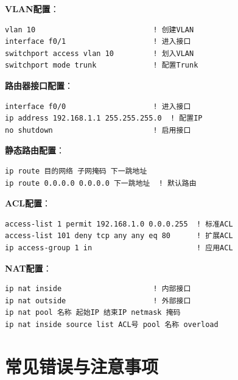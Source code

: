 \documentclass[12pt,a4paper]{ctexart}
\begin{document}
\begin{keybox}
\textbf{VLAN配置}：
\begin{lstlisting}
vlan 10                           ! 创建VLAN
interface f0/1                    ! 进入接口
switchport access vlan 10         ! 划入VLAN
switchport mode trunk             ! 配置Trunk
\end{lstlisting}

\textbf{路由器接口配置}：
\begin{lstlisting}
interface f0/0                    ! 进入接口
ip address 192.168.1.1 255.255.255.0  ! 配置IP
no shutdown                       ! 启用接口
\end{lstlisting}

\textbf{静态路由配置}：
\begin{lstlisting}
ip route 目的网络 子网掩码 下一跳地址
ip route 0.0.0.0 0.0.0.0 下一跳地址  ! 默认路由
\end{lstlisting}

\textbf{ACL配置}：
\begin{lstlisting}
access-list 1 permit 192.168.1.0 0.0.0.255  ! 标准ACL
access-list 101 deny tcp any any eq 80      ! 扩展ACL
ip access-group 1 in                        ! 应用ACL
\end{lstlisting}

\textbf{NAT配置}：
\begin{lstlisting}
ip nat inside                     ! 内部接口
ip nat outside                    ! 外部接口
ip nat pool 名称 起始IP 结束IP netmask 掩码
ip nat inside source list ACL号 pool 名称 overload
\end{lstlisting}
\end{keybox}

\section{常见错误与注意事项}
\end{document}
